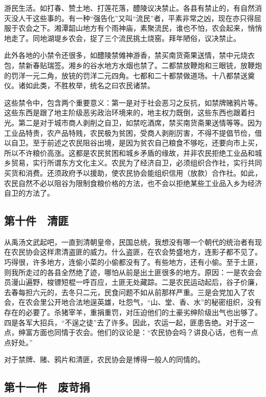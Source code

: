 游民生活。如打春、赞土地、打莲花落，醴陵议决禁止。各县有禁止的，有自然消灭没人干这些事的。有一种“强告化”又叫“流民”者，平素非常之凶，现在亦只得屈服于农会之下。湘潭韶山地方有个雨神庙，素聚流民，谁也不怕，农会起来，悄悄地走了。同地湖堤乡农会，捉了三个流民挑土烧窑。拜年陋俗，议决禁止。

此外各地的小禁令还很多，如醴陵禁傩神游香，禁买南货斋果送情，禁中元烧衣包，禁新春贴瑞签。湘乡的谷水地方水烟也禁了。二都禁放鞭炮和三眼铳，放鞭炮的罚洋一元二角，放铳的罚洋二元四角。七都和二十都禁做道场。十八都禁送奠仪。诸如此类，不胜枚举，统名之曰农民诸禁。

这些禁令中，包含两个重要意义：第一是对于社会恶习之反抗，如禁牌赌鸦片等。这些东西是跟了地主阶级恶劣政治环境来的，地主权力既倒，这些东西也跟着扫光。第二是对于城市商人剥削之自卫，如禁吃酒席，禁买南货斋果送情等等。因为工业品特贵，农产品特贱，农民极为贫困，受商人剥削厉害，不得不提倡节俭，借以自卫。至于前述之农民阻谷出境，是因为贫农自己粮食不够吃，还要向市上买，所以不许粮价高涨。这都是农民贫困和城乡矛盾的缘故，并非农民拒绝工业品和城乡贸易，实行所谓东方文化主义。农民为了经济自卫，必须组织合作社，实行共同买货和消费。还须政府予以援助，使农民协会能组织信用（放款）合作社。如此，农民自然不必以阻谷为限制食粮价格的方法，也不会以拒绝某些工业品入乡为经济自卫的方法了。

\subsection*{第十件　清匪}

从禹汤文武起吧，一直到清朝皇帝，民国总统，我想没有哪一个朝代的统治者有现在农民协会这样肃清盗匪的威力。什么盗匪，在农会势盛地方，连影子都不见了。巧得很，许多地方，连偷小菜的小偷都没有了。有些地方，还有小偷。至于土匪，则我所走过的各县全然绝了迹，哪怕从前是出土匪很多的地方。原因：一是农会会员漫山遍野，梭镖短棍一呼百应，土匪无处藏踪。二是农民运动起后，谷子价廉，去春每担六元的，去冬只二元，民食问题不如从前那样严重。三是会党加入了农会，在农会里公开地合法地逞英雄，吐怨气，“山、堂、香、水”的秘密组织，没有存在的必要了。杀猪宰羊，重捐重罚，对压迫他们的土豪劣绅阶级出气也出够了。四是各军大招兵，“不逞之徒”去了许多。因此，农运一起，匪患告绝。对于这一点，绅富方面也同情于农会。他们的议论是：“农民协会吗？讲良心话，也有一点点好处。”

对于禁牌、赌、鸦片和清匪，农民协会是博得一般人的同情的。

\subsection*{第十一件　废苛捐}

